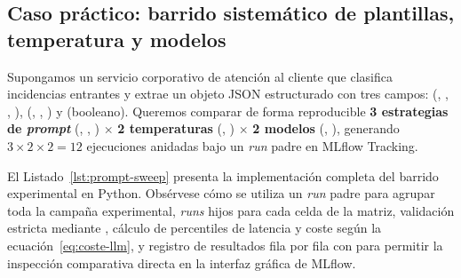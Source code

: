 \subsection{Caso práctico: barrido sistemático de plantillas, temperatura y modelos}\label{subsec:ejemplo-sweep}

\begin{examplebox}
Supongamos un servicio corporativo de atención al cliente que clasifica incidencias entrantes y extrae un objeto JSON estructurado con tres campos:  (, , , ),  (, , ) y  (booleano). Queremos comparar de forma reproducible \textbf{3 estrategias de \textit{prompt}} (, , ) $\times$ \textbf{2 temperaturas} (, ) $\times$ \textbf{2 modelos} (, ), generando $3 \times 2 \times 2 = 12$ ejecuciones anidadas bajo un \textit{run} padre en MLflow Tracking.
\end{examplebox}

El Listado~\ref{lst:prompt-sweep} presenta la implementación completa del barrido experimental en Python. Obsérvese cómo se utiliza un \textit{run} padre para agrupar toda la campaña experimental, \textit{runs} hijos para cada celda de la matriz, validación estricta mediante , cálculo de percentiles de latencia y coste según la ecuación~\eqref{eq:coste-llm}, y registro de resultados fila por fila con  para permitir la inspección comparativa directa en la interfaz gráfica de MLflow.

